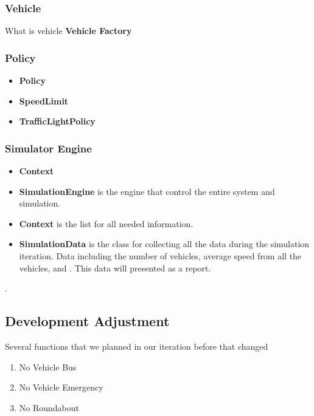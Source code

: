 \documentclass[11pt]{article}
\begin{document}
\subsubsection{Vehicle}
What is vehicle
\textbf{Vehicle Factory}\\


\subsubsection{Policy}        
\begin{itemize}[noitemsep]
\item \textbf{Policy} 
\item \textbf{SpeedLimit} 
\item \textbf{TrafficLightPolicy}
\end{itemize}

\subsubsection{Simulator Engine}
        
\begin{itemize}[noitemsep]
\item \textbf{Context} 
\item \textbf{SimulationEngine} is the engine that control the entire system and simulation.
\item \textbf{Context} is the list for all needed information.
\item \textbf{SimulationData} is the class for collecting all the data during the simulation iteration. Data including the number of vehicles, average speed from all the vehicles, and . This data will presented as a report.
\end{itemize}.
	
\subsection{Development Adjustment}
Several functions that we planned in our iteration before that changed
\begin{enumerate}[noitemsep]
	\item No Vehicle Bus 
	\item No Vehicle Emergency
	\item No Roundabout  
\end{enumerate}
\end{document}
